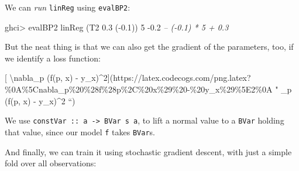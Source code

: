\documentclass[]{article}
\newenvironment{Shaded}{}{}
\newcommand{\CommentTok}[1]{\textcolor[rgb]{0.38,0.63,0.69}{\textit{#1}}}
\newcommand{\DataTypeTok}[1]{\textcolor[rgb]{0.56,0.13,0.00}{#1}}
\newcommand{\DecValTok}[1]{\textcolor[rgb]{0.25,0.63,0.44}{#1}}
\newcommand{\FloatTok}[1]{\textcolor[rgb]{0.25,0.63,0.44}{#1}}
\newcommand{\FunctionTok}[1]{\textcolor[rgb]{0.02,0.16,0.49}{#1}}
\newcommand{\NormalTok}[1]{#1}
\newcommand{\OtherTok}[1]{\textcolor[rgb]{0.00,0.44,0.13}{#1}}
\begin{document}
We can \emph{run} \texttt{linReg} using \texttt{evalBP2}:

\begin{Shaded}
\begin{Highlighting}[]
\NormalTok{ghci}\FunctionTok{>}\NormalTok{ evalBP2 linReg (}\DataTypeTok{T2} \FloatTok{0.3}\NormalTok{ (}\FunctionTok{-}\FloatTok{0.1}\NormalTok{)) }\DecValTok{5}
\FunctionTok{-}\FloatTok{0.2}        \CommentTok{-- (-0.1) * 5 + 0.3}
\end{Highlighting}
\end{Shaded}

But the neat thing is that we can also get the gradient of the parameters, too,
if we identify a loss function:

{[} \textbackslash{}nabla\_p (f(p, x) -
y\_x)\^{}2{]}(https://latex.codecogs.com/png.latex?\%0A\%5Cnabla\_p\%20\%28f\%28p\%2C\%20x\%29\%20-\%20y\_x\%29\%5E2\%0A
" \nabla\_p (f(p, x) - y\_x)\^{}2 ``)

\begin{Shaded}
\end{Shaded}

We use \texttt{constVar\ ::\ a\ -\textgreater{}\ BVar\ s\ a}, to lift a normal
value to a \texttt{BVar} holding that value, since our model \texttt{f} takes
\texttt{BVar}s.

And finally, we can train it using stochastic gradient descent, with just a
simple fold over all observations:
\end{document}
